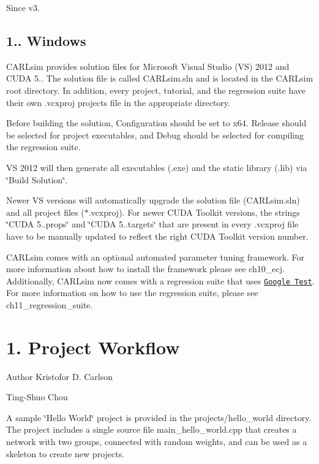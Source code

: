 \begin{DoxySince}{Since}
v3.
\end{DoxySince}
\hypertarget{ch1_getting_started_ch1s2s2_windows}{}\subsection{1.. Windows}\label{ch1_getting_started_ch1s2s2_windows}
C\+A\+R\+Lsim provides solution files for Microsoft Visual Studio (VS) 2012 and C\+U\+DA 5.. The solution file is called {\ttfamily C\+A\+R\+Lsim.\+sln} and is located in the C\+A\+R\+Lsim root directory. In addition, every project, tutorial, and the regression suite have their own .vcxproj projects file in the appropriate directory.

Before building the solution, {\ttfamily Configuration} should be set to {\ttfamily x64}. {\ttfamily Release} should be selected for project executables, and {\ttfamily Debug} should be selected for compiling the regression suite.

VS 2012 will then generate all executables (.exe) and the static library (.lib) via \char`\"{}\+Build Solution\char`\"{}.

Newer VS versions will automatically upgrade the solution file ({\ttfamily C\+A\+R\+Lsim.\+sln}) and all project files ({\ttfamily $\ast$.vcxproj}). For newer C\+U\+DA Toolkit versions, the strings \char`\"{}\+C\+U\+D\+A 5..\+props\char`\"{} and \char`\"{}\+C\+U\+D\+A 5..\+targets\char`\"{} that are present in every .vcxproj file have to be manually updated to reflect the right C\+U\+DA Toolkit version number.

C\+A\+R\+Lsim comes with an optional automated parameter tuning framework. For more information about how to install the framework please see ch10\+\_\+ecj. Additionally, C\+A\+R\+Lsim now comes with a regression suite that uses \href{https://code.google.com/p/googletest/}{\tt Google Test}. For more information on how to use the regression suite, please see ch11\+\_\+regression\+\_\+suite.\hypertarget{ch1_getting_started_ch1s3_project_workflow}{}\section{1. Project Workflow}\label{ch1_getting_started_ch1s3_project_workflow}
\begin{DoxyAuthor}{Author}
Kristofor D. Carlson 

Ting-\/\+Shuo Chou
\end{DoxyAuthor}
A sample \char`\"{}\+Hello World\char`\"{} project is provided in the {\ttfamily projects/hello\+\_\+world} directory. The project includes a single source file {\ttfamily main\+\_\+hello\+\_\+world.\+cpp} that creates a network with two groups, connected with random weights, and can be used as a skeleton to create new projects.


